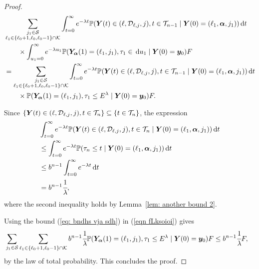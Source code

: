 \begin{proof}
	\begin{align}
		&\sum_{\substack{j_1\in\mathcal S\\\ell_1\in\{\ell_0+1,\ell_0,\ell_0-1\}\cap\mathcal K}}\int_{t=0}^\infty e^{-\lambda t} \mathbb P({\boldsymbol Y}(t) \in (\ell,\mathcal D_{\ell,j},j), t\in\mathcal T_{n-1} \nonumber
		\mid \boldsymbol Y(0)=(\ell_1,\boldsymbol \alpha, j_1)) \, \mathrm{d} t 
		\\&\qquad{}\times\int_{u_1=0}^\infty e^{-\lambda u_1}\mathbb P(\bm{Y}_{\bm{\alpha}}(1)=(\ell_1,j_1), \tau_1\in \, \mathrm{d} u_1
		\mid \boldsymbol Y(0)=\boldsymbol y_0)F  \nonumber 
		\\&=\sum_{\substack{j_1\in\mathcal S\\\ell_1\in\{\ell_0+1,\ell_0,\ell_0-1\}\cap\mathcal K}}\int_{t=0}^\infty e^{-\lambda t} \mathbb P({\boldsymbol Y}(t) \in (\ell,\mathcal D_{\ell,j},j), t\in\mathcal T_{n-1} \nonumber
		\mid \boldsymbol Y(0)=(\ell_1,\boldsymbol\alpha,j_1)) \, \mathrm{d} t 
		\\&\qquad{}\times\mathbb P(\bm{Y}_{\bm{\alpha}}(1)=(\ell_1,j_1), \tau_1\leq E^\lambda
		\mid \boldsymbol Y(0)=\boldsymbol y_0)F. \label{eqn fLksoioi}
	\end{align}
	
	Since \(\{\boldsymbol Y(t)\in(\ell,\mathcal{D}_{\ell,j},j),t\in\mathcal T_n\}\subseteq \{t\in\mathcal T_n\}\), the expression 
	\begin{align}
		&\int_{t=0}^\infty e^{-\lambda t} \mathbb P( {\boldsymbol Y}(t) \in (\ell,\mathcal D_{\ell,j},j), t\in\mathcal T_n\nonumber
		\mid \boldsymbol Y(0)=(\ell_1,\boldsymbol \alpha,j_1)) \, \mathrm{d} t
		\\&\leq \int_{t=0}^\infty e^{-\lambda t} \mathbb P(\tau_{n}\leq t \nonumber
		\mid \boldsymbol Y(0)=(\ell_1,\boldsymbol\alpha,j_1)) \, \mathrm{d} t
		\\&\leq b^{n-1}\int_{t=0}^\infty e^{-\lambda t} \, \mathrm{d} t \nonumber 
		\\&=b^{n-1}\cfrac{1}{\lambda}, \label{eq: bndhs vja sdh}
	\end{align}
	where the second inequality holds by Lemma~\ref{lem: another bound 2}.
	
	Using the bound (\ref{eq: bndhs vja sdh}) in (\ref{eqn fLksoioi}) gives 
	\begin{align}
		&\sum_{j_1\in\mathcal S}\sum_{\ell_1\in\{\ell_0+1,\ell_0-1\}\cap\mathcal K} b^{n-1}\cfrac{1}{\lambda} 
		\mathbb P(\bm{Y}_{\bm{\alpha}}(1)=(\ell_1,j_1), \tau_1\leq E^\lambda
		\mid \boldsymbol Y(0)=\boldsymbol y_0)F\leq b^{n-1}\cfrac{1}{\lambda}F, \label{eqn fLksoioi2}
	\end{align}
	by the law of total probability. This concludes the proof. 
\end{proof}

